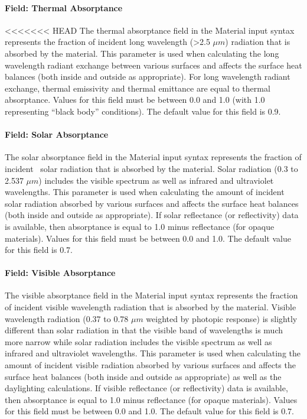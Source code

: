 \paragraph{Field: Thermal Absorptance}\label{field-thermal-absorptance-1}

<<<<<<< HEAD
The thermal absorptance field in the Material input syntax represents the fraction of incident long wavelength (>2.5 $\mu{}m$) radiation that is absorbed by the material. This parameter is used when calculating the long wavelength radiant exchange between various surfaces and affects the surface heat balances (both inside and outside as appropriate). For long wavelength radiant exchange, thermal emissivity and thermal emittance are equal to thermal absorptance. Values for this field must be between 0.0 and 1.0 (with 1.0 representing ``black body'' conditions). The default value for this field is 0.9.

\paragraph{Field: Solar Absorptance}\label{field-solar-absorptance-1}

The solar absorptance field in the Material input syntax represents the fraction of incident~ solar radiation that is absorbed by the material. Solar radiation (0.3 to 2.537 $\mu{}m$) includes the visible spectrum as well as infrared and ultraviolet wavelengths. This parameter is used when calculating the amount of incident solar radiation absorbed by various surfaces and affects the surface heat balances (both inside and outside as appropriate). If solar reflectance (or reflectivity) data is available, then absorptance is equal to 1.0 minus reflectance (for opaque materials). Values for this field must be between 0.0 and 1.0. The default value for this field is 0.7.

\paragraph{Field: Visible Absorptance}\label{field-visible-absorptance-1}

The visible absorptance field in the Material input syntax represents the fraction of incident visible wavelength radiation that is absorbed by the material. Visible wavelength radiation (0.37 to 0.78 $\mu{}m$ weighted by photopic response) is slightly different than solar radiation in that the visible band of wavelengths is much more narrow while solar radiation includes the visible spectrum as well as infrared and ultraviolet wavelengths. This parameter is used when calculating the amount of incident visible radiation absorbed by various surfaces and affects the surface heat balances (both inside and outside as appropriate) as well as the daylighting calculations. If visible reflectance (or reflectivity) data is available, then absorptance is equal to 1.0 minus reflectance (for opaque materials). Values for this field must be between 0.0 and 1.0. The default value for this field is 0.7.

